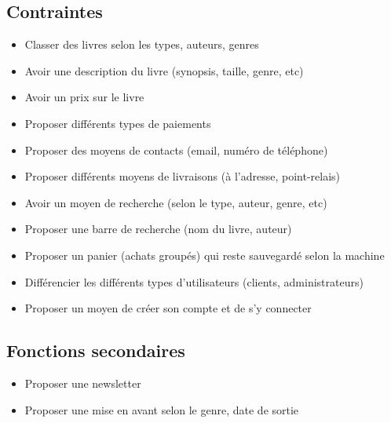 \documentclass[a4paper, 13pt]{article}
\begin{document}
\subsection{Contraintes}
\begin{itemize}
    \item Classer des livres selon les types, auteurs, genres
    \item Avoir une description du livre (synopsis, taille, genre, etc)
    \item Avoir un prix sur le livre
    \item Proposer différents types de paiements
    \item Proposer des moyens de contacts (email, numéro de téléphone)
    \item Proposer différents moyens de livraisons (à l'adresse, point-relais)
    \item Avoir un moyen de recherche (selon le type, auteur, genre, etc)
    \item Proposer une barre de recherche (nom du livre, auteur)
    \item Proposer un panier (achats groupés) qui reste sauvegardé selon la machine
    \item Différencier les différents types d'utilisateurs (clients, administrateurs)
    \item Proposer un moyen de créer son compte et de s'y connecter
\end{itemize}

\subsection{Fonctions secondaires}
\begin{itemize}
    \item Proposer une newsletter
    \item Proposer une mise en avant selon le genre, date de sortie
\end{itemize}
\end{document}
